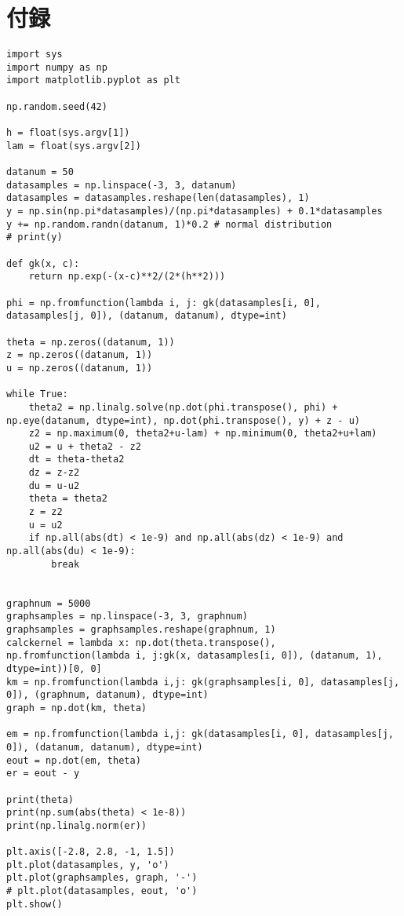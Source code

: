 \documentclass[9pt]{ltjsarticle}
\begin{document}
\section*{付録}
\tiny
\begin{verbatim}
import sys
import numpy as np
import matplotlib.pyplot as plt

np.random.seed(42)

h = float(sys.argv[1])
lam = float(sys.argv[2])

datanum = 50
datasamples = np.linspace(-3, 3, datanum)
datasamples = datasamples.reshape(len(datasamples), 1)
y = np.sin(np.pi*datasamples)/(np.pi*datasamples) + 0.1*datasamples
y += np.random.randn(datanum, 1)*0.2 # normal distribution
# print(y)

def gk(x, c):
    return np.exp(-(x-c)**2/(2*(h**2)))

phi = np.fromfunction(lambda i, j: gk(datasamples[i, 0], datasamples[j, 0]), (datanum, datanum), dtype=int)

theta = np.zeros((datanum, 1))
z = np.zeros((datanum, 1))
u = np.zeros((datanum, 1))

while True:
    theta2 = np.linalg.solve(np.dot(phi.transpose(), phi) + np.eye(datanum, dtype=int), np.dot(phi.transpose(), y) + z - u)
    z2 = np.maximum(0, theta2+u-lam) + np.minimum(0, theta2+u+lam)
    u2 = u + theta2 - z2
    dt = theta-theta2
    dz = z-z2
    du = u-u2
    theta = theta2
    z = z2
    u = u2
    if np.all(abs(dt) < 1e-9) and np.all(abs(dz) < 1e-9) and np.all(abs(du) < 1e-9):
        break
        

graphnum = 5000
graphsamples = np.linspace(-3, 3, graphnum)
graphsamples = graphsamples.reshape(graphnum, 1)
calckernel = lambda x: np.dot(theta.transpose(), np.fromfunction(lambda i, j:gk(x, datasamples[i, 0]), (datanum, 1), dtype=int))[0, 0]
km = np.fromfunction(lambda i,j: gk(graphsamples[i, 0], datasamples[j, 0]), (graphnum, datanum), dtype=int)
graph = np.dot(km, theta)

em = np.fromfunction(lambda i,j: gk(datasamples[i, 0], datasamples[j, 0]), (datanum, datanum), dtype=int)
eout = np.dot(em, theta)
er = eout - y

print(theta)
print(np.sum(abs(theta) < 1e-8))
print(np.linalg.norm(er))

plt.axis([-2.8, 2.8, -1, 1.5])    
plt.plot(datasamples, y, 'o')
plt.plot(graphsamples, graph, '-')
# plt.plot(datasamples, eout, 'o')
plt.show()
\end{verbatim}
\end{document}
